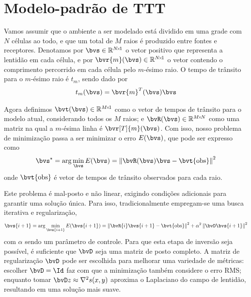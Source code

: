 \section{Modelo-padrão de TTT}
\label{sec:standard_ttt_approach}

Vamos assumir que o ambiente a ser modelado está dividido em uma grade com $N$ células ao todo, e que um total de $M$ raios é produzido entre fontes e receptores. Denotamos por $\bvs \in \re^{\sz{N}{1}}$ o vetor positivo que representa a lentidão em cada célula, e por $\bvr{m}(\bvs) \in \re^{\sz{N}{1}}$ o vetor contendo o comprimento percorrido em cada célula pelo $m$-ésimo raio. O tempo de trânsito para o $m$-ésimo raio é $t_m$, sendo dado por
\begin{equation}
	t_m(\bvs) = \tr{\bvr{m}}(\bvs) \bvs
\end{equation}

Agora definimos $\bvt(\bvs) \in \re^{\sz{M}{1}}$ como o vetor de tempos de trânsito para o modelo atual, considerando todos os $M$ raios; e $\bvR(\bvs) \in \re^{\sz{M}{N}}$ como uma matriz na qual a $m$-ésima linha é $\bvr[T]{m}(\bvs)$. Com isso, nosso problema de minimização passa a ser minimizar o erro $E(\bvs)$, que pode ser expresso como
\begin{equation}
	\opt{\bvs} = \arg\min_{\bvs} E(\bvs) = \norm{\bvR(\bvs) \bvs - \bvt{\obs}}^2
	\label{eq:sec2:def_minimization_bvz}
\end{equation}
onde $\bvt{\obs}$ é vetor de tempos de trânsito observados para cada raio.

Este problema é mal-posto e não linear, exigindo condições adicionais para garantir uma solução única. Para isso, tradicionalmente empregam-se uma busca iterativa e regularização,
\begin{equation}
	\bvs{i+1} = \arg\min_{\bvs{i+1}} E(\bvs{i+1}) = \norm{\bvR{i} \bvs{i+1} - \bvt{\obs}}^2 + \alpha^2 \norm{\bvD \bvs{i+1}}^2
	\label{eqs:sec2:iterative_minimization_Ezi}
\end{equation}
com $\alpha$ sendo um parâmetro de controle. Para que esta etapa de inversão seja possível, é suficiente que $\bvD$ seja uma matriz de posto completo. A matriz de regularização $\bvD$ pode ser escolhida para melhorar uma variedade de métricas: escolher $\bvD = \Id$ faz com que a minimização também considere o erro RMS; enquanto tomar $\bvD z \approx \nabla^2 s(x,y)$ aproxima o Laplaciano do campo de lentidão, resultando em uma solução mais suave.